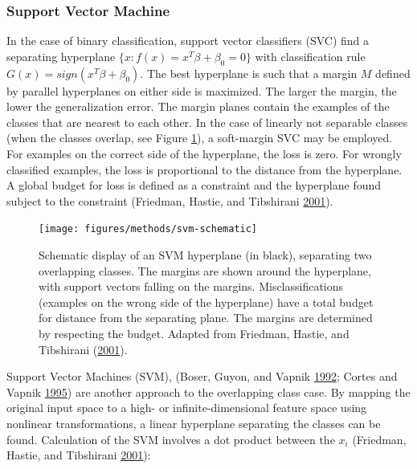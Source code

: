 \documentclass[
  11pt,
  a4paper,
  DIV=12,captions=tableheading,oneside,titlepage]{scrbook}
\begin{document}
\hypertarget{support-vector-machine}{%
\subsubsection{Support Vector Machine}\label{support-vector-machine}}

In the case of binary classification, support vector classifiers (SVC) find a separating hyperplane \(\{x: f(x)=x^T\beta+\beta_0 = 0\}\) with classification rule \(G(x)=sign(x^T\beta+\beta_0)\). The best hyperplane is such that a margin \(M\) defined by parallel hyperplanes on either side is maximized. The larger the margin, the lower the generalization error. The margin planes contain the examples of the classes that are nearest to each other. In the case of linearly not separable classes (when the classes overlap, see Figure \ref{fig:svm-schematic-plot}), a soft-margin SVC may be employed. For examples on the correct side of the hyperplane, the loss is zero. For wrongly classified examples, the loss is proportional to the distance from the hyperplane. A global budget for loss is defined as a constraint and the hyperplane found subject to the constraint (Friedman, Hastie, and Tibshirani \protect\hyperlink{ref-friedman2001elements}{2001}).



\begin{figure}

{\centering \texttt{[image: figures/methods/svm-schematic]} 

}

\caption{Schematic display of an SVM hyperplane (in black), separating two overlapping classes. The margins are shown around the hyperplane, with support vectors falling on the margins. Misclassifications (examples on the wrong side of the hyperplane) have a total budget for distance from the separating plane. The margins are determined by respecting the budget. Adapted from Friedman, Hastie, and Tibshirani (\protect\hyperlink{ref-friedman2001elements}{2001}).}\label{fig:svm-schematic-plot}
\end{figure}

Support Vector Machines (SVM), (Boser, Guyon, and Vapnik \protect\hyperlink{ref-boser1992svc}{1992}; Cortes and Vapnik \protect\hyperlink{ref-cortes1995support}{1995}) are another approach to the overlapping class case. By mapping the original input space to a high- or infinite-dimensional feature space using nonlinear transformations, a linear hyperplane separating the classes can be found. Calculation of the SVM involves a dot product between the \(x_i\) (Friedman, Hastie, and Tibshirani \protect\hyperlink{ref-friedman2001elements}{2001}):
\end{document}
